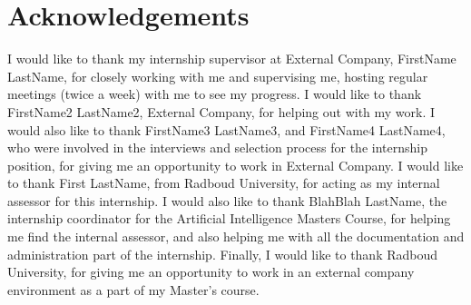 \documentclass[11pt]{article}
\begin{document}
\section{Acknowledgements}

I would like to thank my internship supervisor at External Company, FirstName LastName, for closely working with me and supervising me, hosting regular meetings (twice a week) with me to see my progress. I would like to thank FirstName2 LastName2, External Company, for helping out with my work. I would also like to thank FirstName3 LastName3, and FirstName4 LastName4, who were involved in the interviews and selection process for the internship position, for giving me an opportunity to work in External Company. I would like to thank First LastName, from Radboud University, for acting as my internal assessor for this internship. I would also like to thank BlahBlah LastName, the internship coordinator for the Artificial Intelligence Masters Course, for helping me find the internal assessor, and also helping me with all the documentation and administration part of the internship. Finally, I would like to thank Radboud University, for giving me an opportunity to work in an external company environment as a part of my Master's course. 









\newpage
\printbibliography
\end{document}
